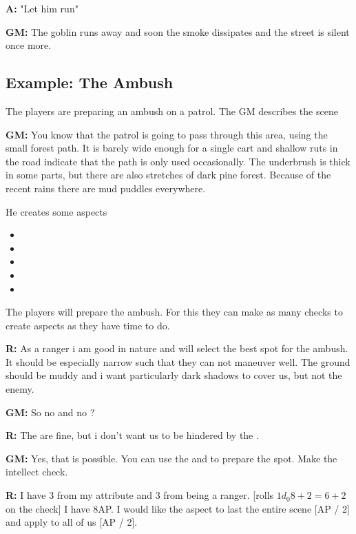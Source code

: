 \documentclass[11pt]{article}
\begin{document}
{\textbf{A:} "Let him run"

\textbf{GM:} The goblin runs away and soon the smoke dissipates and the street is silent once more.
\subsection{Example: The Ambush}
\label{sec:org04bf217}

The players are preparing an ambush on a patrol. The GM describes the scene

\textbf{GM:} You know that the patrol is going to pass through this area, using the small forest path. It is barely wide enough for a single cart and shallow ruts in the road indicate that the path is only used occasionally. The underbrush is thick in some parts, but there are also stretches of dark pine forest. Because of the recent rains there are mud puddles everywhere.

He creates some aspects
\begin{itemize}
\item {}
\item {}
\item {}
\item {}
\item {}
\end{itemize}

The players will prepare the ambush. For this they can make as many checks to create aspects as they have time to do.

\textbf{R:} As a ranger i am good in nature and will select the best spot for the ambush. It should be especially narrow such that they can not maneuver well. The ground should be muddy and i want particularly dark shadows to cover us, but not the enemy.

\textbf{GM:} So no  and no ?

\textbf{R:} The  are fine, but i don't want us to be hindered by the .

\textbf{GM:} Yes, that is possible. You can use the  and  to prepare the spot. Make the intellect check.

\textbf{R:} I have 3 from my attribute and 3 from being a ranger. [rolls \(1 d_0 8 + 2 = 6 + 2\) on the check] I have 8AP. I would like the aspect to last the entire scene [AP / 2] and apply to all of us [AP / 2].

}
\end{document}
